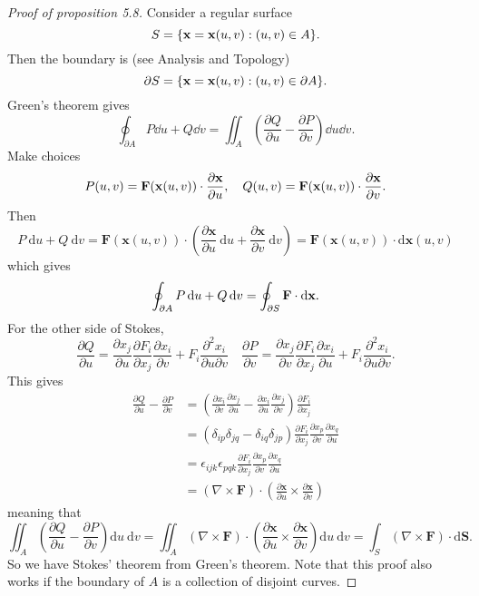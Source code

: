\begin{proof}[Proof of proposition 5.8]
    Consider a regular surface 
    \[
        S = \{{\bf x}={\bf x}(u,v): (u,v)\in A\}.
    \]
    Then the boundary is (see Analysis and Topology)
    \[
        \partial S = \{{\bf x}={\bf x}(u,v): (u,v)\in \partial A\}.
    \]
    Green's theorem gives 
    \[
        \oint_{\partial A} P\dd u+Q\dd v = \iint_{A} \left( \frac{\partial Q}{\partial u}-\frac{\partial P}{\partial v}   \right)\dd u\dd v.
    \]
    Make choices 
    \[
        P(u,v) = {\bf F}({\bf x}(u,v)) \cdot \frac{\partial {\bf x}}{\partial u},\quad Q(u,v) = {\bf F}({\bf x}(u,v)) \cdot \frac{\partial {\bf x}}{\partial v}.  
    \]
    Then 
    \[
        P \mathrm{~d} u+Q \mathrm{~d} v=\mathbf{F}(\mathbf{x}(u, v)) \cdot\left(\frac{\partial \mathbf{x}}{\partial u} \mathrm{~d} u+\frac{\partial \mathbf{x}}{\partial v} \mathrm{~d} v\right)=\mathbf{F}(\mathbf{x}(u, v)) \cdot \mathrm{d} \mathbf{x}(u, v)
    \]
    which gives 
    \[
        \oint_{\partial A} P\,\mathrm{d} u+Q\,\mathrm{d} v = \oint_{\partial S} {\bf F} \cdot \mathrm{d}{\bf x}.
    \]
    For the other side of Stokes, 
    \[
        \frac{\partial Q}{\partial u}=\frac{\partial x_{j}}{\partial u} \frac{\partial F_{i}}{\partial x_{j}} \frac{\partial x_{i}}{\partial v}+F_{i} \frac{\partial^{2} x_{i}}{\partial u \partial v}\quad \frac{\partial P}{\partial v}=\frac{\partial x_{j}}{\partial v} \frac{\partial F_{i}}{\partial x_{j}} \frac{\partial x_{i}}{\partial u}+F_{i} \frac{\partial^{2} x_{i}}{\partial u \partial v}.
    \]
    This gives
    \begin{align*}
        \frac{\partial Q}{\partial u}-\frac{\partial P}{\partial v} &=\left(\frac{\partial x_{i}}{\partial v} \frac{\partial x_{j}}{\partial u}-\frac{\partial x_{i}}{\partial u} \frac{\partial x_{j}}{\partial v}\right) \frac{\partial F_{i}}{\partial x_{j}} \\
        &=\left(\delta_{i p} \delta_{j q}-\delta_{i q} \delta_{j p}\right) \frac{\partial F_{i}}{\partial x_{j}} \frac{\partial x_{p}}{\partial v} \frac{\partial x_{q}}{\partial u} \\
        &=\epsilon_{i j k} \epsilon_{p q k} \frac{\partial F_{i}}{\partial x_{j}} \frac{\partial x_{p}}{\partial v} \frac{\partial x_{q}}{\partial u} \\
        &=(\nabla \times \mathbf{F}) \cdot\left(\frac{\partial \mathbf{x}}{\partial u} \times \frac{\partial \mathbf{x}}{\partial v}\right)
    \end{align*}
    meaning that
    \[
        \iint_{A}\left(\frac{\partial Q}{\partial u}-\frac{\partial P}{\partial v}\right) \mathrm{d} u \mathrm{~d} v=\iint_{A}(\nabla \times \mathbf{F}) \cdot\left(\frac{\partial \mathbf{x}}{\partial u} \times \frac{\partial \mathbf{x}}{\partial v}\right) \mathrm{d} u \mathrm{~d} v=\int_{S}(\nabla \times \mathbf{F}) \cdot \mathrm{d} \mathbf{S} .
    \]
    So we have Stokes' theorem from Green's theorem. Note that this proof also works if the boundary of $A$ is a collection of disjoint curves.
\end{proof}